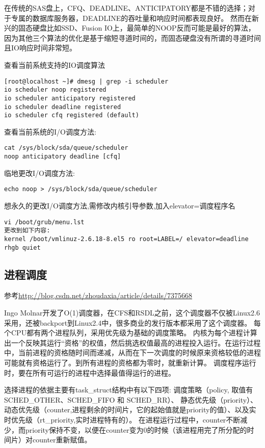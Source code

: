在传统的SAS盘上，CFQ、DEADLINE、ANTICIPATORY都是不错的选择；对于专属的数据库服务器，DEADLINE的吞吐量和响应时间都表现良好。
然而在新兴的固态硬盘比如SSD、Fusion IO上，最简单的NOOP反而可能是最好的算法，因为其他三个算法的优化是基于缩短寻道时间的，而固态硬盘没有所谓的寻道时间且IO响应时间非常短。

查看当前系统支持的IO调度算法
\begin{verbatim}
[root@localhost ~]# dmesg | grep -i scheduler
io scheduler noop registered
io scheduler anticipatory registered
io scheduler deadline registered
io scheduler cfq registered (default)
\end{verbatim}


查看当前系统的I/O调度方法:
\begin{verbatim}
cat /sys/block/sda/queue/scheduler
noop anticipatory deadline [cfq]
\end{verbatim}


临地更改I/O调度方法:
\begin{verbatim}
echo noop > /sys/block/sda/queue/scheduler
\end{verbatim}


想永久的更改I/O调度方法,需修改内核引导参数,加入elevator=调度程序名
\begin{verbatim}
vi /boot/grub/menu.lst
更改到如下内容:
kernel /boot/vmlinuz-2.6.18-8.el5 ro root=LABEL=/ elevator=deadline rhgb quiet
\end{verbatim}


\subsection{进程调度}
参考\url{http://blog.csdn.net/zhoudaxia/article/details/7375668}

Ingo Molnar开发了O(1)调度器，在CFS和RSDL之前，这个调度器不仅被Linux2.6采用，还被backport到Linux2.4中，很多商业的发行版本都采用了这个调度器。
每个CPU都有两个进程队列，采用优先级为基础的调度策略。
内核为每个进程计算出一个反映其运行“资格”的权值，然后挑选权值最高的进程投入运行。在运行过程中，当前进程的资格随时间而递减，从而在下一次调度的时候原来资格较低的进程可能就有资格运行了。到所有进程的资格都为零时，就重新计算。
调度程序运行时，要在所有可运行的进程中选择最值得运行的进程。

选择进程的依据主要有task\_struct结构中有以下四项:
调度策略（policy, 取值有SCHED\_OTHER、SCHED\_FIFO 和 SCHED\_RR）、
静态优先级（priority）、
动态优先级（counter,进程剩余的时间片，它的起始值就是priority的值）、以及实时优先级（rt\_priority,实时进程特有的）。
在进程运行过程中，counter不断减少，而priority保持不变，以便在counter变为0的时候（该进程用完了所分配的时间片）对counter重新赋值。


